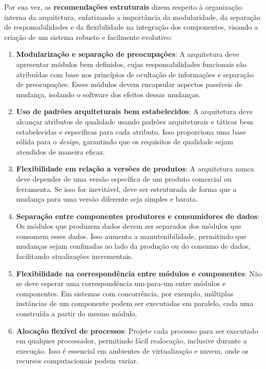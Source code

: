 Por sua vez, as \textbf{recomendações estruturais} dizem respeito à organização interna da arquitetura, enfatizando a importância da modularidade, da separação de responsabilidades e da flexibilidade na integração dos componentes, visando a criação de um sistema robusto e facilmente evolutivo:

\begin{enumerate}
    \item \textbf{Modularização e separação de preocupações}: A arquitetura deve apresentar módulos bem definidos, cujas responsabilidades funcionais são atribuídas com base nos princípios de ocultação de informações e separação de preocupações. Esses módulos devem encapsular aspectos passíveis de mudança, isolando o software dos efeitos dessas mudanças.
    
    \item \textbf{Uso de padrões arquiteturais bem estabelecidos}: A arquitetura deve alcançar atributos de qualidade usando padrões arquiteturais e táticas bem estabelecidas e específicas para cada atributo. Isso proporciona uma base sólida para o \textit{design}, garantindo que os requisitos de qualidade sejam atendidos de maneira eficaz.
    
    \item \textbf{Flexibilidade em relação a versões de produtos}: A arquitetura nunca deve depender de uma versão específica de um produto comercial ou ferramenta. Se isso for inevitável, deve ser estruturada de forma que a mudança para uma versão diferente seja simples e barata.
    
    \item \textbf{Separação entre componentes produtores e consumidores de dados}: Os módulos que produzem dados devem ser separados dos módulos que consomem esses dados. Isso aumenta a manutenibilidade, permitindo que mudanças sejam confinadas ao lado da produção ou do consumo de dados, facilitando atualizações incrementais.
    
    \item \textbf{Flexibilidade na correspondência entre módulos e componentes}: Não se deve esperar uma correspondência um-para-um entre módulos e componentes. Em sistemas com concorrência, por exemplo, múltiplas instâncias de um componente podem ser executadas em paralelo, cada uma construída a partir do mesmo módulo.
    
    \item \textbf{Alocação flexível de processos}: Projete cada processo para ser executado em qualquer processador, permitindo fácil realocação, inclusive durante a execução. Isso é essencial em ambientes de virtualização e nuvem, onde os recursos computacionais podem variar.
    

\end{enumerate}
